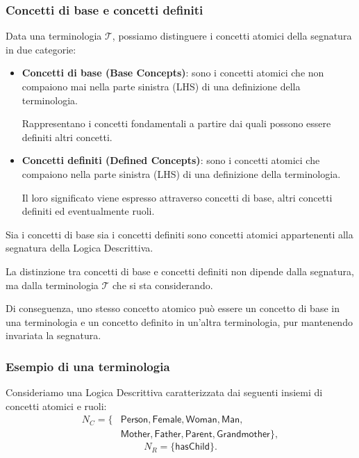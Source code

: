 \subsubsection{Concetti di base e concetti definiti}

Data una terminologia $\mathcal{T}$, possiamo distinguere
i concetti atomici della segnatura in due categorie:

\begin{itemize}
    \item \textbf{Concetti di base (Base Concepts)}:
    sono i concetti atomici che non compaiono mai nella parte
    sinistra (LHS) di una definizione della terminologia.

    Rappresentano i concetti fondamentali a partire dai quali
    possono essere definiti altri concetti.

    \item \textbf{Concetti definiti (Defined Concepts)}:
    sono i concetti atomici che compaiono nella parte
    sinistra (LHS) di una definizione della terminologia.

    Il loro significato viene espresso attraverso concetti
    di base, altri concetti definiti ed eventualmente ruoli.
\end{itemize}

\begin{observation}{}
    Sia i concetti di base sia i concetti definiti sono
    concetti atomici appartenenti alla segnatura della
    Logica Descrittiva.

    La distinzione tra concetti di base e concetti definiti
    non dipende dalla segnatura, ma dalla terminologia
    $\mathcal{T}$ che si sta considerando.

    Di conseguenza, uno stesso concetto atomico può essere
    un concetto di base in una terminologia e un concetto
    definito in un'altra terminologia, pur mantenendo
    invariata la segnatura.
\end{observation}

\subsubsection{Esempio di una terminologia}

Consideriamo una Logica Descrittiva caratterizzata dai
seguenti insiemi di concetti atomici e ruoli:
\[
\begin{aligned}
    N_C = \{&
    \mathsf{Person}, \mathsf{Female},
    \mathsf{Woman}, \mathsf{Man},\\
    &\mathsf{Mother}, \mathsf{Father},
    \mathsf{Parent}, \mathsf{Grandmother}\},
\end{aligned}
\]
\[
    N_R = \{\mathsf{hasChild}\}.
\]

